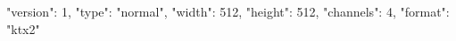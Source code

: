 {
  "version": 1,
  "type": "normal",
  "width": 512,
  "height": 512,
  "channels": 4,
  "format": "ktx2"
}
